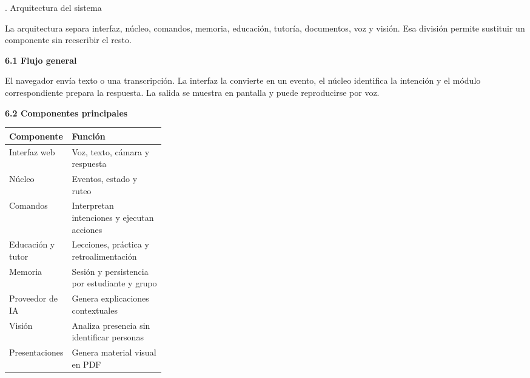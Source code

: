 \documentclass[11pt]{article}
\newcommand{\SectionNum}[2]{%
  \par\phantomsection\label{sec:#1}%
  {\normalfont\fontsize{14}{17}\selectfont #1. #2\par}%
  \vspace{7pt}%
}
\newcommand{\SubsectionNum}[2]{%
  \par\vspace{4pt}%
  {\normalfont\fontsize{12}{16.7}\selectfont\bfseries #1 #2\par}%
  \vspace{3pt}%
}
\begin{document}
\clearpage
\SectionNum{6}{Arquitectura del sistema}
La arquitectura separa interfaz, núcleo, comandos, memoria, educación, tutoría, documentos, voz y visión. Esa división permite sustituir un componente sin reescribir el resto.

\begin{center}
\end{center}

\SubsectionNum{6.1}{Flujo general}
El navegador envía texto o una transcripción. La interfaz la convierte en un evento, el núcleo identifica la intención y el módulo correspondiente prepara la respuesta. La salida se muestra en pantalla y puede reproducirse por voz.

\clearpage
\SubsectionNum{6.2}{Componentes principales}
\begin{center}
\begin{tabularx}{0.94\linewidth}{|>{\raggedright\arraybackslash}p{0.30\linewidth}|X|}
\hline
\rowcolor{tablehead}\textbf{Componente} & \textbf{Función}\\
\hline
Interfaz web & Voz, texto, cámara y respuesta\\
\hline
Núcleo & Eventos, estado y ruteo\\
\hline
Comandos & Interpretan intenciones y ejecutan acciones\\
\hline
Educación y tutor & Lecciones, práctica y retroalimentación\\
\hline
Memoria & Sesión y persistencia por estudiante y grupo\\
\hline
Proveedor de IA & Genera explicaciones contextuales\\
\hline
Visión & Analiza presencia sin identificar personas\\
\hline
Presentaciones & Genera material visual en PDF\\
\hline
\end{tabularx}
\end{center}
\end{document}

